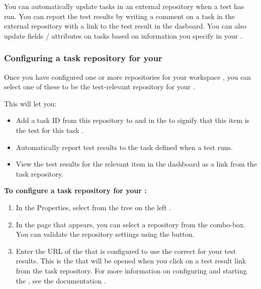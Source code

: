 You can automatically update tasks in an external repository when a test has run. You can report the test results by writing a comment on a task in the external repository with a link to the test result in the dasboard. You can also update fields / attributes on tasks based on information you specify in your \gdproject{}. 

\subsubsection{Configuring a task repository for your \gdproject{}}
\label{TasksALMConfigureProject}
Once you have configured one or more repositories for your workspace , you can select one of these to be the test-relevant repository for your \gdproject{}. 

This will let you:
\begin{itemize}
\item Add a task ID from this repository to \gdcases{} and \gdsuites{} in the \gdproject{} to signify that this item is the test for this task .
\item Automatically report test results to the task defined when a test runs.
\item View the test results for the relevant item in the dashboard as a link from the task repository.
\end{itemize}

\textbf{To configure a task repository for your \gdproject{}:}

\begin{enumerate}
\item In the \gdproject{} Properties, select  from the tree on the left .
\item In the page that appears, you can select a repository from the combo-box. You can validate the repository settings using the button.
\item Enter the URL of the \dash{} that is configured to use the correct \gddb{} for your test results. This is the \dash{} that will be opened when you click on a test result link from the task repository. For more information on configuring and starting the \dash{}, see the documentation .
\end{enumerate}

